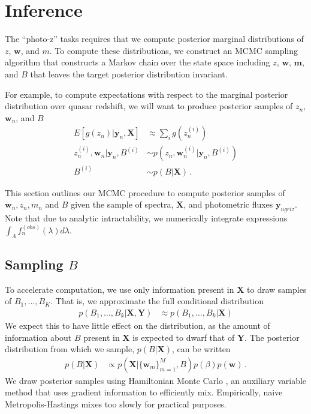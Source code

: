 \documentclass{article}
\begin{document}
\section{Inference}
\label{sec:inference}
The ``photo-z'' tasks requires that we compute posterior marginal distributions of $z$, $\mathbf{w}$, and $m$.  To compute these distributions, we construct an MCMC sampling algorithm that constructs a Markov chain over the state space including $z$, $\mathbf{w}$, $\mathbf{m}$, and $B$ that leaves the target posterior distribution invariant.  
 
For example, to compute expectations with respect to the marginal posterior distribution over quasar redshift, we will want to produce posterior samples of $z_n$, $\mathbf{w}_n$, and $B$
\begin{align}
  E[ g(z_n) | \mathbf{y}_n, \mathbf{X} ] 
    &\approx \sum_{i} g(z_n^{(i)}) \\
    z_n^{(i)}, \mathbf{w}_n | \mathbf{y}_n, B^{(i)} &\sim p(z_n, \mathbf{w}_n^{(i)} | \mathbf{y}_n, B^{(i)}) \\
    B^{(i)} &\sim p(B | \mathbf{X}) \, .
\end{align}

This section outlines our MCMC procedure to compute posterior samples of $\mathbf{w}_n, z_n, m_n$ and $B$ given the sample of spectra, $\mathbf{X}$, and photometric fluxes $\mathbf{y}_{ugriz}$.  Note that due to analytic intractability, we numerically integrate expressions $\int_\Lambda f_n^{(obs)}(\lambda) d\lambda$. 

\subsection{Sampling $B$}
To accelerate computation, we use only information present in $\mathbf{X}$ to draw samples of $B_1, \dots, B_K$.  That is, we approximate the full conditional distribution 
\begin{align}
  p(B_1,\dots, B_k | \mathbf{X}, \mathbf{Y}) 
    &\approx p(B_1, \dots, B_k | \mathbf{X})
\end{align}
We expect this to have little effect on the distribution, as the amount of information about $B$ present in $\mathbf{X}$ is expected to dwarf that of $\mathbf{Y}$.  The posterior distribution from which we sample, $p(B | \mathbf{X})$, can be written 
\begin{align}
  p(B | \mathbf{X}) 
    &\propto p(\mathbf{X} | \{ \mathbf{w}_m\}_{m=1}^M, B) p(\beta) p(\mathbf{w}) \, .
\end{align}
We draw posterior samples using Hamiltonian Monte Carlo \cite{neal2011mcmc}, an auxiliary variable method that uses gradient information to efficiently mix.  Empirically, naive Metropolis-Hastings mixes too slowly for practical purposes. 
\end{document}
